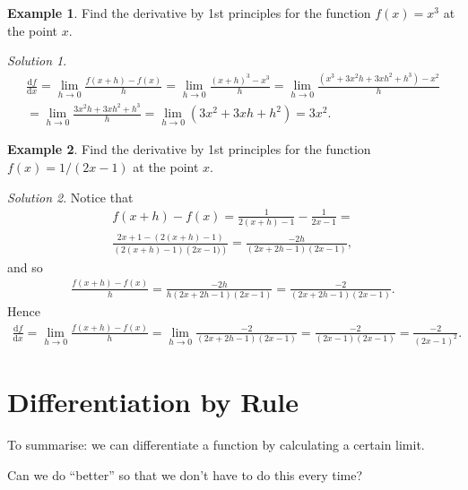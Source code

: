 \documentclass[
  11pt,
  oneside]{book}
\newcommand{\slide}{}
\theoremstyle{definition}
\theoremstyle{definition}
\newtheorem{example}{Example}[chapter]
\theoremstyle{definition}
\theoremstyle{definition}
\theoremstyle{remark}
\newtheorem*{solution}{Solution}
\begin{document}
\slide

\begin{example}
Find the derivative by 1st principles for the function \(f(x) = x^3\) at the point \(x\).
\end{example}

\begin{solution}
\begin{gather*}
\frac{\mathrm{d} f}{\mathrm{d} x} = \lim\limits_{h\to0}\frac{f(x+h)-f(x)}{h} = \lim\limits_{h\to0}\frac{(x+h)^3 - x^3}{h} = \lim\limits_{h\to0}\frac{(x^3+3x^2h+3xh^2+h^3)-x^2}{h}\\ = \lim\limits_{h\to0}\frac{3x^2h+3xh^2+h^3}{h} = \lim\limits_{h\to0}(3x^2+3xh+h^2) = 3x^2.
\end{gather*}
\end{solution}

\slide

\begin{example}
Find the derivative by 1st principles for the function \(f(x) = 1/(2x-1)\) at the point \(x\).
\end{example}

\begin{solution}
Notice that
\begin{gather*}
f(x+h)-f(x) = \frac{1}{2(x+h)-1} - \frac{1}{2x-1} =\\ \frac{2x+1-\left(2(x+h)-1\right)}{\left(2(x+h)-1\right)\left(2x-1)\right)} = \frac{-2h}{(2x+2h-1)(2x-1)},
\end{gather*}
and so
\begin{gather*}
\frac{f(x+h)-f(x)}{h} = \frac{-2h}{h(2x+2h-1)(2x-1)} = \frac{-2}{(2x+2h-1)(2x-1)}.
\end{gather*}
Hence
\begin{gather*}
\frac{\mathrm{d} f}{\mathrm{d} x} = \lim\limits_{h\to0}\frac{f(x+h)-f(x)}{h} = \lim\limits_{h\to0}\frac{-2}{(2x+2h-1)(2x-1)} = \frac{-2}{(2x-1)(2x-1)} = \frac{-2}{(2x-1)^2}.
\end{gather*}
\end{solution}

\section{Differentiation by Rule}\label{lecture-three}

To summarise: we can differentiate a function by calculating a certain limit.

Can we do ``better'' so that we don't have to do this every time?
\end{document}
